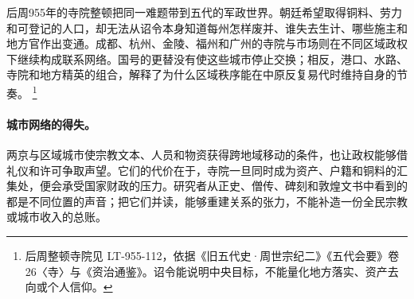 后周955年的寺院整顿把同一难题带到五代的军政世界。朝廷希望取得铜料、劳力和可登记的人口，却无法从诏令本身知道每州怎样废并、谁失去生计、哪些施主和地方官作出变通。成都、杭州、金陵、福州和广州的寺院与市场则在不同区域政权下继续构成联系网络。国号的更替没有使这些城市停止交换；相反，港口、水路、寺院和地方精英的组合，解释了为什么区域秩序能在中原反复易代时维持自身的节奏。%
\footnote{后周整顿寺院见 LT-955-112，依据《旧五代史·周世宗纪二》《五代会要》卷26〈寺〉与《资治通鉴》。诏令能说明中央目标，不能量化地方落实、资产去向或个人信仰。}

\paragraph{城市网络的得失。}
两京与区域城市使宗教文本、人员和物资获得跨地域移动的条件，也让政权能够借礼仪和许可争取声望。它们的代价在于，寺院一旦同时成为资产、户籍和铜料的汇集处，便会承受国家财政的压力。研究者从正史、僧传、碑刻和敦煌文书中看到的都是不同位置的声音；把它们并读，能够重建关系的张力，不能补造一份全民宗教或城市收入的总账。
